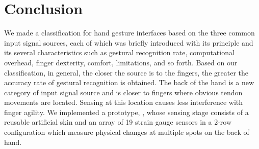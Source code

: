 \documentclass{sigchi}
\begin{document}



\section{Conclusion}
We made a classification for hand gesture interfaces based on the three common input signal sources, each of which was briefly introduced with its principle and its several characteristics such as gestural recognition rate, computational overhead, finger dexterity, comfort, limitations, and so forth. Based on our classification, in general, the closer the source is to the fingers, the greater the accuracy rate of gestural recognition is obtained.
The back of the hand is a new category of input signal source and is closer to fingers where obvious tendon movements are located. Sensing at this location causes less interference with finger agility. We implemented a prototype, \getTitleName, whose sensing stage consists of a reusable artificial skin and an array of 19 strain gauge sensors in a 2-row configuration which measure physical changes at multiple spots on the back of hand.
\end{document}
